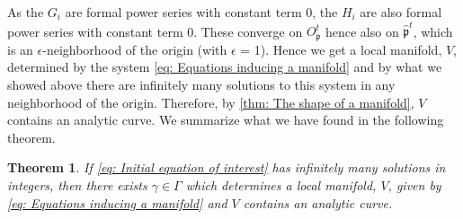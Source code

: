 \documentclass{article}
\newtheorem{theorem}{Theorem}[section]
\newcommand{\mfrak}[1]{\mathfrak{#1}}
\numberwithin{equation}{section}
\begin{document}
As the $G_i$ are formal power series with constant term 0, the $H_i$ are also formal power series with constant term 0. These converge on $O_\mfrak p^t$ hence also on $\hat {\mfrak p}^t$, which is an $\epsilon$-neighborhood of the origin (with $\epsilon$ = 1). Hence we get a local manifold, $V$, determined by the system \cref{eq: Equations inducing a manifold} and by what we showed above there are infinitely many solutions to this system in any neighborhood of the origin. Therefore, by \cref{thm: The shape of a manifold}, $V$ contains an analytic curve. We summarize what we have found in the following theorem.
\begin{theorem}\label{thm: Skolems method}
	If \cref{eq: Initial equation of interest} has infinitely many solutions in integers, then there exists $\gamma \in \Gamma$ which determines a local manifold, $V$, given by \cref{eq: Equations inducing a manifold} and $V$ contains an analytic curve.
\end{theorem}
\end{document}
